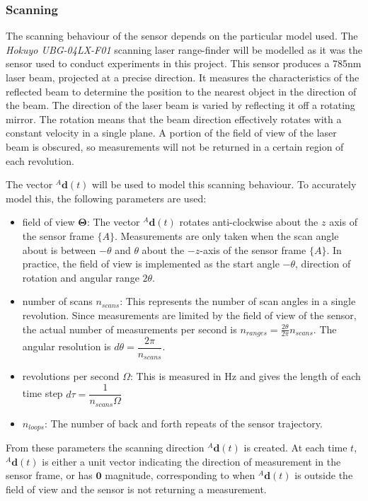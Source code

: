\subsubsection{Scanning} \label{sec:scanmodel}
The scanning behaviour of the sensor depends on the particular model used. The \textit{Hokuyo UBG-04LX-F01} scanning laser range-finder will be modelled as it was the sensor used to conduct experiments in this project. This sensor produces a 785nm laser beam, projected at a precise direction. It measures the characteristics of the reflected beam to determine the position to the nearest object in the direction of the beam. The direction of the laser beam is varied by reflecting it off a rotating mirror. The rotation means that the beam direction effectively rotates with a constant velocity in a single plane. A portion of the field of view of the laser beam is obscured, so measurements will not be returned in a certain region of each revolution.

The vector ${^{A}\mathbf{d}(t)}$ will be used to model this scanning behaviour.
To accurately model this, the following parameters are used:
\begin{itemize}
\item field of view $\mathbf{\Theta}$: The vector ${^{A}\mathbf{d}(t)}$ rotates anti-clockwise about the $z$ axis of the sensor frame $\{A\}$. Measurements are only taken when the scan angle about is between $-\theta$ and $\theta$ about the $-z$-axis of the sensor frame $\{A\}$. In practice, the field of view is implemented as the start angle $-\theta$, direction of rotation and angular range $2\theta$.
\item number of scans $n_{scans}$: This represents the number of scan angles in a single revolution. Since measurements are limited by the field of view of the sensor, the actual number of measurements per second is $n_{ranges} = \frac{2\theta}{2\pi}n_{scans}$. The angular resolution is $d\theta = \dfrac{2\pi}{n_{scans}}$.
\item revolutions per second $\Omega$: This is measured in Hz and gives the length of each time step $d\tau = \dfrac{1}{n_{scans}\Omega}$
\item $n_{loops}$: The number of back and forth repeats of the sensor trajectory.
\end{itemize}
From these parameters the scanning direction ${^{A}\mathbf{d}(t)}$ is created. At each time $t$, ${^{A}\mathbf{d}(t)}$ is either a unit vector indicating the direction of measurement in the sensor frame, or has $\mathbf{0}$ magnitude, corresponding to when ${^{A}\mathbf{d}(t)}$ is outside the field of view and the sensor is not returning a measurement.

